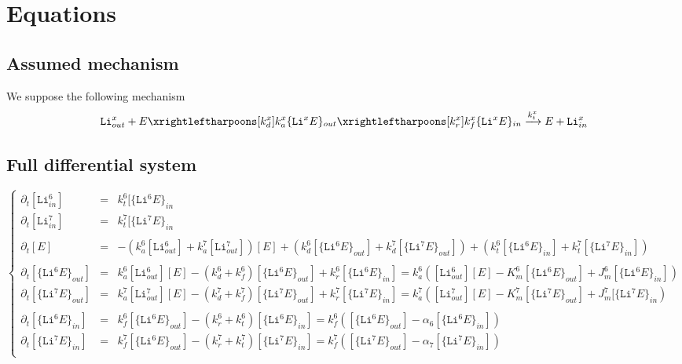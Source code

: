 \documentclass[aps,onecolumn]{revtex4}
\newcommand{\mychem}[1]{\mathtt{#1}}
\begin{document}
\section{Equations}
\subsection{Assumed mechanism}
We suppose the following mechanism
\begin{equation}
	\mychem{Li}^{x}_{out} + E \xrightleftharpoons[k_d^{x}]{k_a^{x}}
	\lbrace\mychem{Li}^xE\rbrace_{out} 
	\xrightleftharpoons[k_r^{x}]{k_f^{x}} 
	\lbrace\mychem{Li}^xE\rbrace_{in}
	\xrightarrow{k_t^x} E + \mychem{Li}^{x}_{in}
\end{equation}

\subsection{Full differential system}
\begin{equation}
	\left\lbrace
	\begin{array}{ccl}
	\partial_t [\mychem{Li}^6_{in}] & = &k_t^6[\lbrace\mychem{Li}^6E\rbrace_{in}  \\
	\partial_t [\mychem{Li}^7_{in}] & = &k_t^7[\lbrace\mychem{Li}^7E\rbrace_{in}  \\
	\\
	\partial_t [E] & = &
	-\left(k_a^6[\mychem{Li}^6_{out}]+k_a^7[\mychem{Li}^7_{out}]\right)[E] 
	+\left(k_d^6[\lbrace\mychem{Li}^6E\rbrace_{out}]+k_d^7[\lbrace\mychem{Li}^7E\rbrace_{out}]\right)
	+\left(k_t^6[\lbrace\mychem{Li}^6E\rbrace_{in} ]+k_t^7[\lbrace\mychem{Li}^7E\rbrace_{in} ]\right)
	\\
	\\
	\partial_t[\lbrace\mychem{Li}^6E\rbrace_{out}] & = & 
	k_a^6[\mathtt{Li}^6_{out}][E] - (k_d^6+k_f^6) [\lbrace\mychem{Li}^6E\rbrace_{out}]
	+k_r^6[\lbrace\mychem{Li}^6E\rbrace_{in}]
	= k_a^6 \left([\mathtt{Li}^6_{out}][E] -K_m^6 [\lbrace\mychem{Li}^6E\rbrace_{out}] + J_m^6 [\lbrace\mychem{Li}^6E\rbrace_{in}]\right)
	\\
	\partial_t[\lbrace\mychem{Li}^7E\rbrace_{out}] & = & 
	k_a^7[\mathtt{Li}^7_{out}][E] - (k_d^7+k_f^7) [\lbrace\mychem{Li}^7E\rbrace_{out}]
	+k_r^7[\lbrace\mychem{Li}^7E\rbrace_{in}]
	= k_a^7 \left([\mathtt{Li}^7_{out}][E] -K_m^7 [\lbrace\mychem{Li}^7E\rbrace_{out}] + J_m^7 [\lbrace\mychem{Li}^7E\rbrace_{in}\right)
	\\
	\\
	\partial_t[\lbrace\mychem{Li}^6E\rbrace_{in}] & = & 
	k_f^6 [\lbrace\mychem{Li}^6E\rbrace_{out}] - (k_r^6+k_t^6) [\lbrace\mychem{Li}^6E\rbrace_{in}]
	= k_f^6 \left( [\lbrace\mychem{Li}^6E\rbrace_{out}] - \alpha_6 [\lbrace\mychem{Li}^6E\rbrace_{in}]\right)
	\\
	\partial_t[\lbrace\mychem{Li}^7E\rbrace_{in}] & = & 
	k_f^7 [\lbrace\mychem{Li}^6E\rbrace_{out}] - (k_r^7+k_t^7) [\lbrace\mychem{Li}^7E\rbrace_{in}]
	= k_f^7 \left( [\lbrace\mychem{Li}^7E\rbrace_{out}] - \alpha_7 [\lbrace\mychem{Li}^7E\rbrace_{in}]\right)
	\\
	\end{array}
	\right. 
\end{equation}
\end{document}
